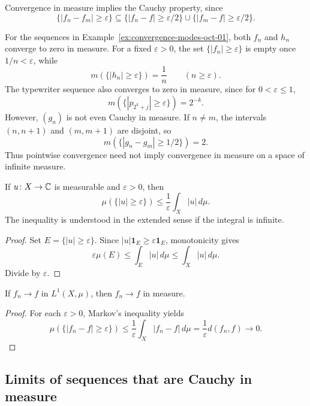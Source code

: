 Convergence in measure implies the Cauchy property, since
\[
  \{|f_n-f_m|\geq\varepsilon\}
    \subseteq\{|f_n-f|\geq\varepsilon/2\}
      \cup\{|f_m-f|\geq\varepsilon/2\}.
\]

\begin{example}
  For the sequences in Example~\ref{ex:convergence-modes-oct-01},
  both $f_n$ and $h_n$ converge to zero in measure. For a fixed
  $\varepsilon>0$, the set $\{|f_n|\geq\varepsilon\}$ is empty
  once $1/n<\varepsilon$, while
  \[
    m(\{|h_n|\geq\varepsilon\})=\frac1n
      \qquad(n\geq\varepsilon).
  \]
  The typewriter sequence also converges to zero in measure, since
  for $0<\varepsilon\leq1$,
  \[
    m(\{|p_{2^k+j}|\geq\varepsilon\})=2^{-k}.
  \]
  However, $(g_n)$ is not even Cauchy in measure. If $n\neq m$, the
  intervals $(n,n+1)$ and $(m,m+1)$ are disjoint, so
  \[
    m(\{|g_n-g_m|\geq1/2\})=2.
  \]
  Thus pointwise convergence need not imply convergence in measure
  on a space of infinite measure.
\end{example}

\begin{lemma}\label{lem:markov-oct-01}
  If $u\colon X\to\mathbb{C}$ is measurable and $\varepsilon>0$, then
  \[
    \mu(\{|u|\geq\varepsilon\})
      \leq\frac1\varepsilon\int_X|u|\,d\mu.
  \]
  The inequality is understood in the extended sense if the integral
  is infinite.
\end{lemma}

\begin{proof}
  Set $E=\{|u|\geq\varepsilon\}$. Since
  $|u|\mathbf 1_E\geq\varepsilon\mathbf 1_E$, monotonicity gives
  \[
    \varepsilon\mu(E)\leq\int_E|u|\,d\mu
      \leq\int_X|u|\,d\mu.
  \]
  Divide by $\varepsilon$.
\end{proof}

\begin{proposition}\label{prop:l1-in-measure-oct-01}
  If $f_n\to f$ in $L^1(X,\mu)$, then $f_n\to f$ in measure.
\end{proposition}

\begin{proof}
  For each $\varepsilon>0$, Markov's inequality yields
  \[
    \mu(\{|f_n-f|\geq\varepsilon\})
      \leq\frac1\varepsilon\int_X|f_n-f|\,d\mu
      =\frac1\varepsilon d(f_n,f)\longrightarrow0.
  \]
\end{proof}

\subsection{Limits of sequences that are Cauchy in measure}

